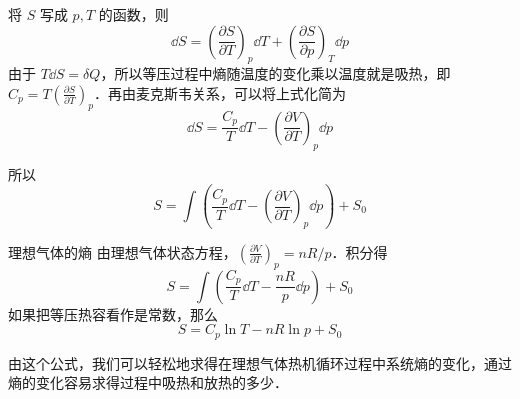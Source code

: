 

将 $S$ 写成 $p,T$ 的函数，则
\begin{equation}
\dd S=\left(\frac{\partial S}{\partial T}\right)_p \dd T+\left(\frac{\partial S}{\partial p}\right)_T \dd p
\end{equation}
由于 $T\dd S=\delta Q$，所以等压过程中熵随温度的变化乘以温度就是吸热，即 $C_p=T\left(\frac{\partial S}{\partial T}\right)_p$．再由麦克斯韦关系，可以将上式化简为
\begin{equation}
\dd S=\frac{C_p}{T}\dd T-\left(\frac{\partial V}{\partial T}\right)_p\dd p
\end{equation}

所以
\begin{equation}\label{MacroS_eq1}
S=\int \left(\frac{C_p}{T}\dd T-\left(\frac{\partial V}{\partial T}\right)_p\dd p\right)+S_0
\end{equation}

\begin{example}{理想气体的熵}
由理想气体状态方程，$\left(\frac{\partial V}{\partial T}\right)_p=nR/p$．积分得
\begin{equation}\label{MacroS_eq2}
S=\int \left(\frac{C_p}{T}\dd T-\frac{nR}{p}\dd p\right)+S_0
\end{equation}
如果把等压热容看作是常数，那么
\begin{equation}
S=C_p\ln T-nR\ln p+S_0
\end{equation}

由这个公式，我们可以轻松地求得在理想气体热机循环过程中系统熵的变化，通过熵的变化容易求得过程中吸热和放热的多少．
\end{example}
